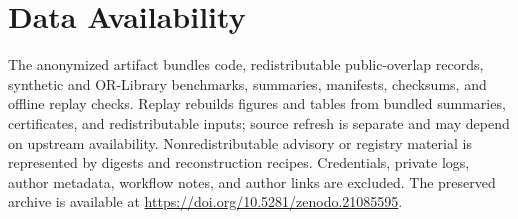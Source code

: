 \documentclass[10pt,conference]{IEEEtran}
\begin{document}
\section{Data Availability}
The anonymized artifact bundles code, redistributable public-overlap records, synthetic and OR-Library benchmarks, summaries, manifests, checksums, and offline replay checks. Replay rebuilds figures and tables from bundled summaries, certificates, and redistributable inputs; source refresh is separate and may depend on upstream availability. Nonredistributable advisory or registry material is represented by digests and reconstruction recipes. Credentials, private logs, author metadata, workflow notes, and author links are excluded. The preserved archive is available at \url{https://doi.org/10.5281/zenodo.21085595}.



\end{document}
